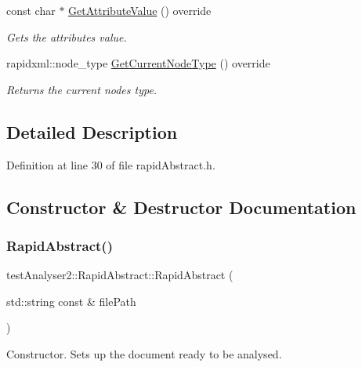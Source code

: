 \begin{DoxyCompactItemize}
const char $\ast$ \mbox{\hyperlink{classtestAnalyser2_1_1RapidAbstract_abdb39cb9f3d094518d8d3fcfb1ae0d64}{Get\+Attribute\+Value}} () override
\begin{DoxyCompactList}\small\item\em Gets the attribute\textquotesingle{}s value. \end{DoxyCompactList}\item 
rapidxml\+::node\+\_\+type \mbox{\hyperlink{classtestAnalyser2_1_1RapidAbstract_a9897ce59179b6bf0a0e76845931f39fb}{Get\+Current\+Node\+Type}} () override
\begin{DoxyCompactList}\small\item\em Returns the current node\textquotesingle{}s type. \end{DoxyCompactList}\end{DoxyCompactItemize}


\subsection{Detailed Description}


Definition at line 30 of file rapid\+Abstract.\+h.



\subsection{Constructor \& Destructor Documentation}
\mbox{\label{classtestAnalyser2_1_1RapidAbstract_a88b6e63f4d070a4274904e5dfd4d5941}} 
\subsubsection{\texorpdfstring{RapidAbstract()}{RapidAbstract()}}
{\footnotesize\ttfamily test\+Analyser2\+::\+Rapid\+Abstract\+::\+Rapid\+Abstract (\begin{DoxyParamCaption}\item[{std\+::string const \&}]{file\+Path }\end{DoxyParamCaption})\hspace{0.3cm}{\ttfamily [explicit]}}



Constructor. Sets up the document ready to be analysed. 


